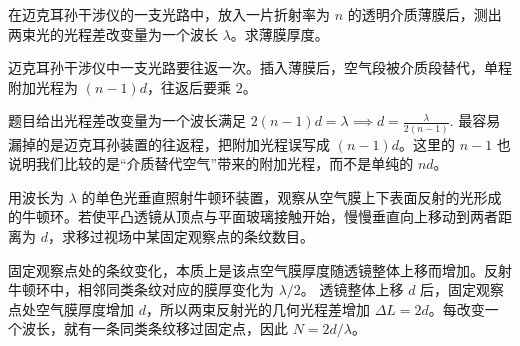 \begin{exercise}
在迈克耳孙干涉仪的一支光路中，放入一片折射率为 \(n\) 的透明介质薄膜后，测出两束光的光程差改变量为一个波长 \(\lambda\)。求薄膜厚度。
\end{exercise}

\begin{solution}
迈克耳孙干涉仪中一支光路要往返一次。插入薄膜后，空气段被介质段替代，单程附加光程为 \((n-1)d\)，往返后要乘 \(2\)。

题目给出光程差改变量为一个波长满足
 \(2(n-1)d=\lambda \implies d=\frac{\lambda}{2(n-1)}.\) 
最容易漏掉的是迈克耳孙装置的往返程，把附加光程误写成 \((n-1)d\)。这里的 \(n-1\) 也说明我们比较的是“介质替代空气”带来的附加光程，而不是单纯的 \(nd\)。
\end{solution}

\begin{exercise}
用波长为 \(\lambda\) 的单色光垂直照射牛顿环装置，观察从空气膜上下表面反射的光形成的牛顿环。若使平凸透镜从顶点与平面玻璃接触开始，慢慢垂直向上移动到两者距离为 \(d\)，求移过视场中某固定观察点的条纹数目。
\end{exercise}

\begin{solution}
固定观察点处的条纹变化，本质上是该点空气膜厚度随透镜整体上移而增加。反射牛顿环中，相邻同类条纹对应的膜厚变化为 \(\lambda/2\)。
透镜整体上移 \(d\) 后，固定观察点处空气膜厚度增加 \(d\)，所以两束反射光的几何光程差增加 \(\Delta L=2d\)。每改变一个波长，就有一条同类条纹移过固定点，因此 \(N=2d/\lambda\)。
\end{solution}

